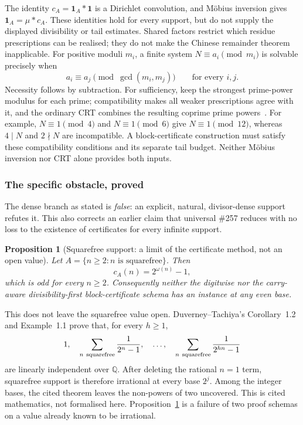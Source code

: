 \documentclass[11pt]{article}
\theoremstyle{plain}
\newtheorem{prop}[thm]{Proposition}
\theoremstyle{definition}
\theoremstyle{remark}
\newcommand{\Q}{\mathbb{Q}}
\begin{document}
The identity $c_A=\mathbf1_A*\mathbf1$ is a Dirichlet convolution,
and M\"obius inversion gives $\mathbf1_A=\mu*c_A$.  These identities
hold for every support, but do not supply the displayed divisibility
or tail estimates.  Shared factors restrict which residue prescriptions
can be realised; they do not make the Chinese remainder theorem
inapplicable.  For positive moduli $m_i$, a finite system
$N\equiv a_i\pmod{m_i}$ is solvable precisely when
\[
 a_i\equiv a_j\pmod{\gcd(m_i,m_j)}\qquad\text{for every }i,j.
\]
Necessity follows by subtraction.  For sufficiency, keep the strongest
prime-power modulus for each prime; compatibility makes all weaker
prescriptions agree with it, and the ordinary CRT combines the
resulting coprime prime powers~\cite[Theorem~3.1, pp.~2--3]{conradcrt}.
For example, $N\equiv1\pmod4$ and $N\equiv1\pmod6$ give
$N\equiv1\pmod{12}$, whereas $4\mid N$ and $2\nmid N$ are
incompatible.  A block-certificate construction must satisfy these
compatibility conditions and its separate tail budget.  Neither
M\"obius inversion nor CRT alone provides both inputs.

\subsubsection*{The specific obstacle, proved}

The dense branch as stated is \emph{false}: an explicit, natural, divisor-dense support refutes
it.  This also corrects an earlier claim that universal \#257 reduces with no loss to the
existence of certificates for every infinite support.

\begin{prop}[Squarefree support: a limit of the certificate method, not an open value]
\label{prop:squarefree}
Let $A=\{n\ge2:n\text{ is squarefree}\}$.  Then
\[
  c_{A}(n)=2^{\omega(n)}-1,
\]
which is odd for every $n\ge2$.  Consequently neither the digitwise nor the
carry-aware divisibility-first block-certificate schema has an instance at
any even base.
\end{prop}

This does not leave the squarefree value open.  Duverney--Tachiya's
Corollary~1.2 and Example~1.1 prove that, for every $h\ge1$,
\[
  1,\quad
  \sum_{n\ {\rm squarefree}}\frac1{2^n-1},\quad\ldots,\quad
  \sum_{n\ {\rm squarefree}}\frac1{2^{hn}-1}
\]
are linearly independent over $\Q$.  After deleting the rational $n=1$
term, squarefree support is therefore irrational at every base $2^j$.
Among the integer bases, the cited theorem leaves the non-powers of two
uncovered.  This is cited mathematics, not formalised here.  Proposition~\ref{prop:squarefree}
is a failure of two proof schemas on a value already known to be irrational.
\end{document}
